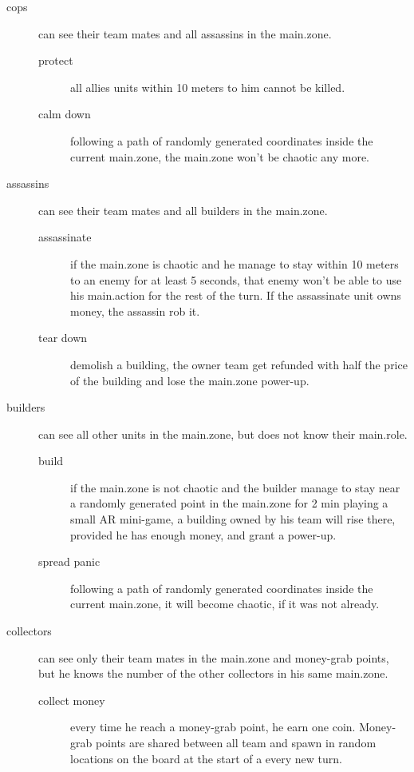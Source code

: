 			\begin{description}
				\item[cops] can see their team mates and all assassins in the main.zone.
					\begin{description}
						\item[protect] all allies units within 10 meters to him cannot be killed.
						\item[calm down] following a path of randomly generated coordinates inside the current main.zone, the main.zone won't be chaotic any more.
					\end{description}
				\item[assassins] can see their team mates and all builders in the main.zone.
					\begin{description}
						\item[assassinate] if the main.zone is chaotic and he manage to stay within 10 meters to an enemy for at least 5 seconds, that enemy won't be able to use his main.action for the rest of the turn. If the assassinate unit owns money, the assassin rob it.
						\item[tear down] demolish a building, the owner team get refunded with half the price of the building and lose the main.zone power-up.
					\end{description}
				\item[builders] can see all other units in the main.zone, but does not know their main.role.
					\begin{description}
						\item[build] if the main.zone is not chaotic and the builder manage to stay near a randomly generated point in the main.zone for 2 min playing a small AR mini-game, a building owned by his team will rise there, provided he has enough money, and grant a power-up.
						\item[spread panic] following a path of randomly generated coordinates inside the current main.zone, it will become chaotic, if it was not already.
					\end{description}
				\item[collectors] can see only their team mates in the main.zone and money-grab points, but he knows the number of the other collectors in his same main.zone.
					\begin{description}
						\item[collect money] every time he reach a money-grab point, he earn one coin. Money-grab points are shared between all team and spawn in random locations on the board at the start of a every new turn.
					\end{description}
			\end{description}
			
